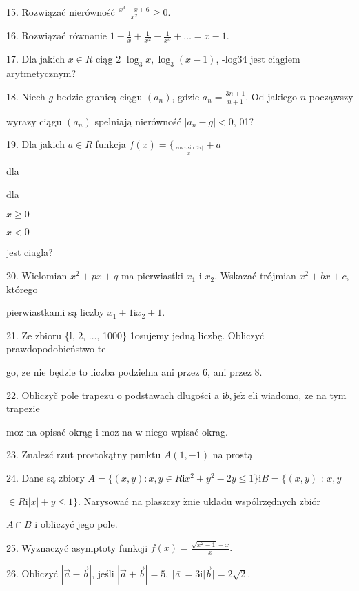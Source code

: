 \documentclass[a4paper,12pt]{article}
\begin{document}
15. Rozwiązać nierówność $\displaystyle \frac{x^{3}-x+6}{x^{2}}\geq 0.$




16. Rozwiązać równanie $1-\displaystyle \frac{1}{x}+\frac{1}{x^{2}}-\frac{1}{x^{3}}+\ldots=x-1.$

17. Dla jakich $x\in R$ ciąg 2 $\log_{3}x, \log_{3}(x-1)$, -log34 jest ciągiem arytmetycznym?

18. Niech $g$ bedzie granicą ciągu $(a_{n})$, gdzie $a_{n} = \displaystyle \frac{3n+1}{n+1}$. Od jakiego $n$ począwszy

wyrazy ciągu $(a_{n})$ spelniają nierówność $|a_{n}-g|<0$, 01?

19. Dla jakich $a\in R$ funkcja $f(x)=\{_{\frac{\cos x\sin|2x|}{x}}+a$

dla

dla

$x\geq 0$

$x<0$

jest ciagla?

20. Wielomian $x^{2}+px+q$ ma pierwiastki $x_{1}$ i $x_{2}$. Wskazać trójmian $x^{2}+bx+c$, którego

pierwiastkami są liczby $x_{1}+1\mathrm{i}x_{2}+1.$

21. Ze zbioru \{l, 2, $\ldots$, 1000\} 1osujemy jedną liczbę. Obliczyć prawdopodobieństwo te-

go, $\dot{\mathrm{z}}\mathrm{e}$ nie będzie to liczba podzielna ani przez 6, ani przez 8.

22. Obliczyč pole trapezu o podstawach dlugości a $\mathrm{i}b, \mathrm{j}\mathrm{e}\dot{\mathrm{z}}$ eli wiadomo, $\dot{\mathrm{z}}\mathrm{e}$ na tym trapezie

$\mathrm{m}\mathrm{o}\dot{\mathrm{z}}$ na opisać okrąg i $\mathrm{m}\mathrm{o}\dot{\mathrm{z}}$ na w niego wpisać okrag.

23. Znalez$\acute{}$ć rzut prostokątny punktu $A(1,-1)$ na prostą 

24. Dane są zbiory $A=\{(x,y):x,y\in R\mathrm{i}x^{2}+y^{2}-2y\leq 1\} \mathrm{i} B=\{(x,y)$ : $x, y$

$\in R \mathrm{i} |x|+y \leq 1\}$. Narysować na plaszczy $\acute{\mathrm{z}}\mathrm{n}\mathrm{i}\mathrm{e}$ ukladu wspólrzędnych zbiór

$A\cap B$ i obliczyć jego pole.

25. Wyznaczyć asymptoty funkcji $f(x)=\displaystyle \frac{\sqrt{x^{2}-1}-x}{x}.$

26. Obliczyć $|\vec{a}-\vec{b}|$, jeśli $|\vec{a}+\vec{b}|=5,\ |${\it ã}$| =3\mathrm{i}|\vec{b}|=2\sqrt{2}.$
\end{document}
